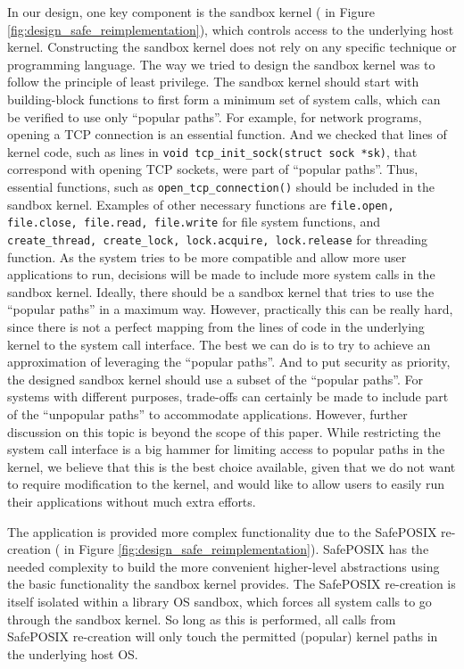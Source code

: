 In our \lip design, one key component is the sandbox kernel ( in Figure \ref{fig:design_safe_reimplementation}), 
which controls access to the underlying host kernel. 
Constructing the sandbox kernel does not rely on any specific technique or programming language. 
The way we tried to design the sandbox kernel was to follow the principle of least privilege. 
The sandbox kernel should start with building-block functions to first form a minimum set of system calls, which can be verified to 
use only ``popular paths''. For example, for network programs, opening a TCP connection is an essential function. 
And we checked that lines of kernel code, such as lines in \texttt{void tcp\_init\_sock(struct sock *sk)}, that correspond 
with opening TCP sockets, were part of ``popular paths''. Thus, essential functions, such as \texttt{open\_tcp\_connection()} should be 
included in the sandbox kernel. Examples of other necessary functions are \texttt{file.open, file.close, file.read, file.write} for file system 
functions, and \texttt{create\_thread, create\_lock, lock.acquire, lock.release} for threading function. 
As the system tries to be more compatible and allow more user applications to run, decisions will be made to include more 
system calls in the sandbox kernel. Ideally, there should be a sandbox kernel that tries to use the ``popular paths'' in a maximum way. 
However, practically this can be really hard, since there is not a perfect mapping from the lines of code in the underlying kernel to the 
system call interface. The best we can do is to try to achieve an approximation of leveraging the ``popular paths''. 
And to put security as priority, the designed sandbox kernel should use a subset of the ``popular paths''. 
For systems with different purposes, trade-offs can certainly be made to include part of the ``unpopular paths'' to accommodate applications. 
However, further discussion on this topic is beyond the scope of this paper. 
While restricting the system call interface is a big hammer for limiting access to popular paths in the kernel, 
we believe that this is the best choice available, given that we do not want to require modification to the kernel, and 
would like to allow users to easily run their applications without much extra efforts. 

The application is provided more complex functionality due to the SafePOSIX re-creation
( in Figure \ref{fig:design_safe_reimplementation}).
SafePOSIX has the needed complexity to build the more convenient higher-level
abstractions using the basic functionality the sandbox kernel provides.
The SafePOSIX re-creation is itself isolated within a library OS sandbox, which
forces all system calls to go through the sandbox kernel.
So long as this is performed, all calls from SafePOSIX re-creation will only touch the permitted (popular) kernel paths in the underlying host OS.


